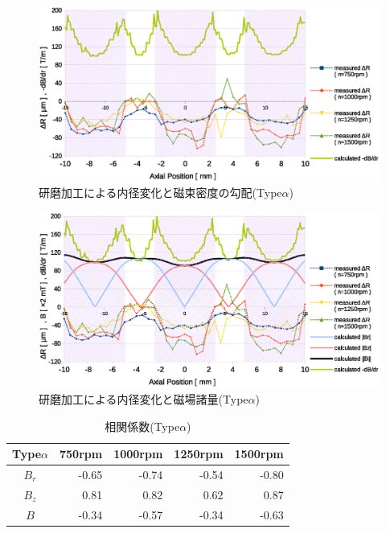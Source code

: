 \documentclass[11pt]{jarticle}
\begin{document}
  \begin{figure}[H]
    \begin{center}
      \includegraphics[width=150mm]{Typealpha_dB.eps}
    \end{center}
    \caption{研磨加工による内径変化と磁束密度の勾配(Type$\alpha$)}
    \label{fig:Typealpha_dB}
  \end{figure}

  \begin{figure}[H]
    \begin{center}
      \includegraphics[width=150mm]{Typealpha.eps}
    \end{center}
    \caption{研磨加工による内径変化と磁場諸量(Type$\alpha$)}
    \label{fig:Typealpha}
  \end{figure}


  \begin{table}[H]
    \begin{tabular}{|c|r|r|r|r|} \hline 
         Type$\alpha$ & 750rpm & 1000rpm & 1250rpm & 1500rpm \\ \hline
         $B_r$ & -0.65 & -0.74  & -0.54 & -0.80 \\ \hline
         $B_z$ & 0.81 & 0.82 & 0.62 & 0.87 \\ \hline
         $B$ & -0.34 & -0.57 & -0.34 & -0.63 \\ \hline
    \end{tabular}
    \centering
    \caption{相関係数(Type$\alpha$)}
    \label{tab:CC_alpha}
  \end{table}
\end{document}
